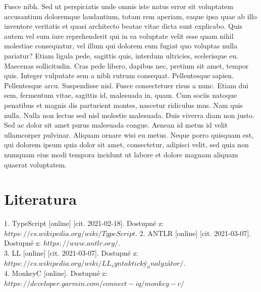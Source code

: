\documentclass[czech,master,dept460,male,cpp,cpdeclaration]{diploma}
\begin{document}
Fusce nibh. Sed ut perspiciatis unde omnis iste natus error sit voluptatem accusantium doloremque laudantium, totam rem aperiam, eaque ipsa quae ab illo inventore veritatis et quasi architecto beatae vitae dicta sunt explicabo. Quis autem vel eum iure reprehenderit qui in ea voluptate velit esse quam nihil molestiae consequatur, vel illum qui dolorem eum fugiat quo voluptas nulla pariatur? Etiam ligula pede, sagittis quis, interdum ultricies, scelerisque eu. Maecenas sollicitudin. Cras pede libero, dapibus nec, pretium sit amet, tempor quis. Integer vulputate sem a nibh rutrum consequat. Pellentesque sapien. Pellentesque arcu. Suspendisse nisl. Fusce consectetuer risus a nunc. Etiam dui sem, fermentum vitae, sagittis id, malesuada in, quam. Cum sociis natoque penatibus et magnis dis parturient montes, nascetur ridiculus mus. Nam quis nulla. Nulla non lectus sed nisl molestie malesuada. Duis viverra diam non justo. Sed ac dolor sit amet purus malesuada congue. Aenean id metus id velit ullamcorper pulvinar. Aliquam ornare wisi eu metus. Neque porro quisquam est, qui dolorem ipsum quia dolor sit amet, consectetur, adipisci velit, sed quia non numquam eius modi tempora incidunt ut labore et dolore magnam aliquam quaerat voluptatem.

\section{Literatura}
1. TypeScript [online] [cit. 2021-02-18]. Dostupné z: $https://cs.wikipedia.org/wiki/TypeScript$.
2. ANTLR [online] [cit. 2021-03-07]. Dostupné z: $https://www.antlr.org/$.\\
3. LL [online] [cit. 2021-03-07]. Dostupné z: $https://cs.wikipedia.org/wiki/LL_syntaktický_analyzátor/$.\\
4. MonkeyC [online]. Dostupné z: $https://developer.garmin.com/connect-iq/monkey-c/$


\printbibliography[title={Literatura}, heading=bibintoc]
\end{document}
